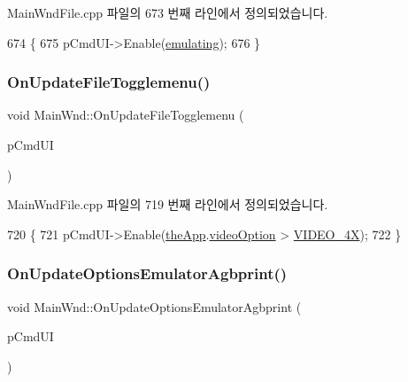 Main\+Wnd\+File.\+cpp 파일의 673 번째 라인에서 정의되었습니다.


\begin{DoxyCode}
674 \{
675   pCmdUI->Enable(\mbox{\hyperlink{_main_wnd_file_8cpp_af9cc36078b1b311753963297ae7f2a74}{emulating}});  
676 \}
\end{DoxyCode}
\mbox{\label{class_main_wnd_aa5c872c99d1d656c74971eb67f4a2b97}} 
\subsubsection{\texorpdfstring{On\+Update\+File\+Togglemenu()}{OnUpdateFileTogglemenu()}}
{\footnotesize\ttfamily void Main\+Wnd\+::\+On\+Update\+File\+Togglemenu (\begin{DoxyParamCaption}\item[{C\+Cmd\+UI $\ast$}]{p\+Cmd\+UI }\end{DoxyParamCaption})\hspace{0.3cm}{\ttfamily [protected]}}



Main\+Wnd\+File.\+cpp 파일의 719 번째 라인에서 정의되었습니다.


\begin{DoxyCode}
720 \{
721   pCmdUI->Enable(\mbox{\hyperlink{_v_b_a_8cpp_a8095a9d06b37a7efe3723f3218ad8fb3}{theApp}}.\mbox{\hyperlink{class_v_b_a_a17dac073149c897f770c00ed7098ad32}{videoOption}} > \mbox{\hyperlink{_v_b_a_8h_a531c35e38ede3ea4e5ba5afb24b29493a6468bce6b84e6350d3de126f257eb38d}{VIDEO\_4X}});  
722 \}
\end{DoxyCode}
\mbox{\label{class_main_wnd_aad1f7f9bff514babc68d81e52bdfdd92}} 
\subsubsection{\texorpdfstring{On\+Update\+Options\+Emulator\+Agbprint()}{OnUpdateOptionsEmulatorAgbprint()}}
{\footnotesize\ttfamily void Main\+Wnd\+::\+On\+Update\+Options\+Emulator\+Agbprint (\begin{DoxyParamCaption}\item[{C\+Cmd\+UI $\ast$}]{p\+Cmd\+UI }\end{DoxyParamCaption})\hspace{0.3cm}{\ttfamily [protected]}}



